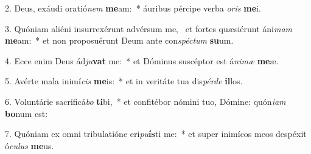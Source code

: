 2. Deus, exáudi oratió\textit{nem} \textbf{me}am:~*  áuribus pércipe verba \textit{o}\textit{ris} \textbf{me}i.\

3. Quóniam aliéni insurrexérunt advérsum me, \dag\  et fortes quæsiérunt áni\textit{mam} \textbf{me}am:~*  et non proposuérunt Deum ante con\textit{spéc}\textit{tum} \textbf{su}um.\

4. Ecce enim Deus ád\textit{ju}\textbf{vat} me:~*  et Dóminus suscéptor est á\textit{ni}\textit{mæ} \textbf{me}æ.\

5. Avérte mala inimí\textit{cis} \textbf{me}is:~*  et in veritáte tua dis\textit{pér}\textit{de} \textbf{il}los.\

6. Voluntárie sacrificá\textit{bo} \textbf{ti}bi,~*  et confitébor nómini tuo, Dómine: quón\textit{i}\textit{am} \textbf{bo}num est:\

7. Quóniam ex omni tribulatióne eri\textit{pu}\textbf{ís}ti me:~*  et super inimícos meos despéxit ó\textit{cu}\textit{lus} \textbf{me}us.\

